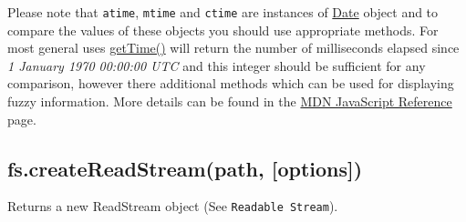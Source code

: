 \begin{Shaded}
\begin{Highlighting}[]
\NormalTok{\{ }\NormalTok{: }\NormalTok{,}
  \NormalTok{: }\NormalTok{,}
  \NormalTok{: }\NormalTok{,}
  \NormalTok{: }\NormalTok{,}
  \NormalTok{: }\NormalTok{,}
  \NormalTok{: }\NormalTok{,}
  \NormalTok{: }\NormalTok{,}
  \NormalTok{: }\NormalTok{,}
  \NormalTok{: }\NormalTok{,}
  \NormalTok{: }\NormalTok{,}
    \NormalTok{:}\NormalTok{:} 
    \NormalTok{:}\NormalTok{:} 
    \NormalTok{:}\NormalTok{:} 
\end{Highlighting}
\end{Shaded}

Please note that \texttt{atime}, \texttt{mtime} and \texttt{ctime} are
instances of
\href{https://developer.mozilla.org/en/JavaScript/Reference/Global\_Objects/Date}{Date}
object and to compare the values of these objects you should use
appropriate methods. For most general uses
\href{https://developer.mozilla.org/en/JavaScript/Reference/Global\_Objects/Date/getTime}{getTime()}
will return the number of milliseconds elapsed since \emph{1 January
1970 00:00:00 UTC} and this integer should be sufficient for any
comparison, however there additional methods which can be used for
displaying fuzzy information. More details can be found in the
\href{https://developer.mozilla.org/en/JavaScript/Reference/Global\_Objects/Date}{MDN
JavaScript Reference} page.

\subsection{fs.createReadStream(path, {[}options{]})}

Returns a new ReadStream object (See \texttt{Readable Stream}).

